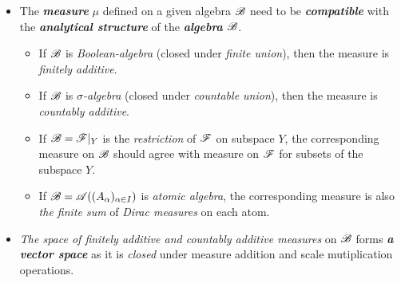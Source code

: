 \documentclass[11pt]{article}
\begin{document}
\begin{itemize}
\item \begin{remark}
The \emph{\textbf{measure}} $\mu$ defined on a given algebra ${\mathscr B}$ need to be \emph{\textbf{compatible}} with the \emph{\textbf{analytical structure}} of the \emph{\textbf{algebra}} ${\mathscr B}$.
\begin{itemize}
\item If ${\mathscr B}$ is \emph{Boolean-algebra} (closed under \emph{finite union}), then the measure is \emph{finitely  additive}.
\item If ${\mathscr B}$ is \emph{$\sigma$-algebra} (closed under \emph{countable union}), then the measure is \emph{countably additive}. 
\item If ${\mathscr B} = {\mathscr F}|_{Y}$ is the \emph{restriction} of ${\mathscr F}$ on subspace $Y$, the corresponding measure on ${\mathscr B}$ should agree with measure on ${\mathscr F}$ for subsets of the subspace $Y$.
\item If ${\mathscr B} = {\mathscr A}((A_{\alpha})_{\alpha \in I})$ is \emph{atomic algebra}, the corresponding measure is also \emph{the finite sum} of \emph{Dirac measures} on each atom.
\end{itemize}
\end{remark}

\item \begin{remark}
\emph{The space of finitely additive and countably additive measures} on ${\mathscr B}$ forms \emph{\textbf{a vector space}} as it is \emph{closed} under measure addition and scale mutiplication operations.
\end{remark}
\end{itemize}
\end{document}
